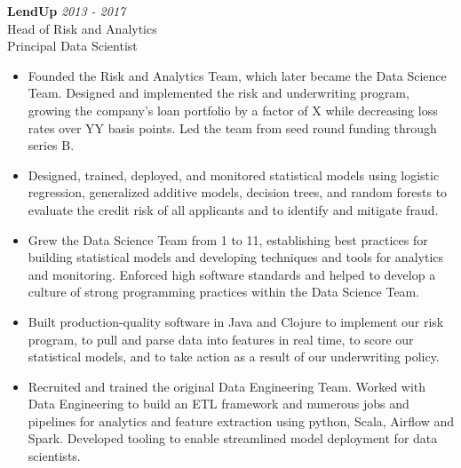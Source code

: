 \documentclass[9pt]{article}
\newenvironment{changemargin}[2]{%
  \begin{list}{}{%
    \setlength{\topsep}{0pt}%
    \setlength{\leftmargin}{#1}%
    \setlength{\rightmargin}{#2}%
    \setlength{\listparindent}{\parindent}%
    \setlength{\itemindent}{\parindent}%
    \setlength{\parsep}{\parskip}%
  }%
  \item[]}{\end{list}
}
\newenvironment{body} {
  \vspace*{-16pt}
\begin{changemargin}{-0.25in}{-0.5in}
  }
{\end{changemargin}
}
\begin{document}
\begin{body}

  \vspace{14pt}

  \textbf{LendUp} \hfill \emph{2013 - 2017}\\
  Head of Risk and Analytics \\
  Principal Data Scientist
  \begin{itemize}

    \item Founded the Risk and Analytics Team, which later became the Data Science Team.  Designed and implemented the risk and underwriting program, growing the company's loan portfolio by a factor of X while decreasing loss rates over YY basis points.  Led the team from seed round funding through series B. \\

    \item Designed, trained, deployed, and monitored statistical models using logistic regression, generalized additive models, decision trees, and random forests to evaluate the credit risk of all applicants and to identify and mitigate fraud. \\

    \item Grew the Data Science Team from 1 to 11, establishing best practices for building statistical models and developing techniques and tools for analytics and monitoring.  Enforced high software standards and helped to develop a culture of strong programming practices within the Data Science Team. \\

    \item Built production-quality software in Java and Clojure to implement our risk program, to pull and parse data into features in real time, to score our statistical models, and to take action as a result of our underwriting policy. \\

    \item Recruited and trained the original Data Engineering Team.  Worked with Data Engineering to build an ETL framework and numerous jobs and pipelines for analytics and feature extraction using python, Scala, Airflow and Spark.  Developed tooling to enable streamlined model deployment for data scientists. \\
  \end{itemize}

        \medskip


\end{body}
\end{document}
